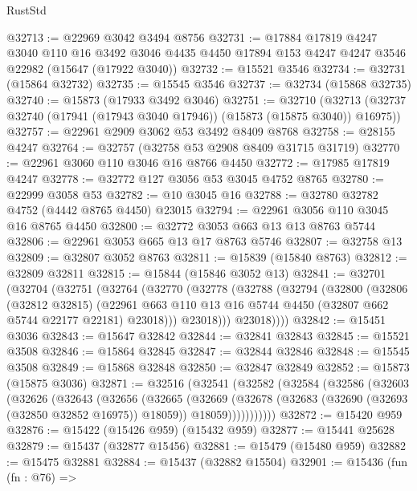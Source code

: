 \begin{lexlean}{RustStd}
\begin{coremodule}
@32713 := @22969 @3042 @3494 @8756
@32731 := @17884
    @17819
    @4247
    @3040
    @110
    @16
    @3492
    @3046
    @4435
    @4450
    @17894
    @153
    @4247
    @4247
    @3546
    @22982
    (@15647 (@17922 @3040))
@32732 := @15521 @3546
@32734 := @32731 (@15864 @32732)
@32735 := @15545 @3546
@32737 := @32734 (@15868 @32735)
@32740 := @15873 (@17933 @3492 @3046)
@32751 := @32710
    (@32713 (@32737 @32740 (@17941 (@17943 @3040 @17946)) (@15873 (@15875 @3040)) @16975))
@32757 := @22961 @2909 @3062 @53 @3492 @8409 @8768
@32758 := @28155 @4247
@32764 := @32757 (@32758 @53 @2908 @8409 @31715 @31719)
@32770 := @22961 @3060 @110 @3046 @16 @8766 @4450
@32772 := @17985 @17819 @4247
@32778 := @32772 @127 @3056 @53 @3045 @4752 @8765
@32780 := @22999 @3058 @53
@32782 := @10 @3045 @16
@32788 := @32780 @32782 @4752 (@4442 @8765 @4450) @23015
@32794 := @22961 @3056 @110 @3045 @16 @8765 @4450
@32800 := @32772 @3053 @663 @13 @13 @8763 @5744
@32806 := @22961 @3053 @665 @13 @17 @8763 @5746
@32807 := @32758 @13
@32809 := @32807 @3052 @8763
@32811 := @15839 (@15840 @8763)
@32812 := @32809 @32811
@32815 := @15844 (@15846 @3052 @13)
@32841 := @32701
    (@32704
      (@32751
        (@32764
          (@32770
            (@32778
              (@32788
                (@32794
                  (@32800
                    (@32806
                      (@32812 @32815)
                      (@22961
                        @663
                        @110
                        @13
                        @16
                        @5744
                        @4450
                        (@32807 @662 @5744 @22177 @22181)
                        @23018)))
                  @23018)))
            @23018))))
@32842 := @15451 @3036
@32843 := @15647 @32842
@32844 := @32841 @32843
@32845 := @15521 @3508
@32846 := @15864 @32845
@32847 := @32844 @32846
@32848 := @15545 @3508
@32849 := @15868 @32848
@32850 := @32847 @32849
@32852 := @15873 (@15875 @3036)
@32871 := @32516
    (@32541
      (@32582
        (@32584
          (@32586
            (@32603
              (@32626
                (@32643
                  (@32656
                    (@32665
                      (@32669
                        (@32678
                          (@32683 (@32690 (@32693 (@32850 @32852 @16975)) @18059))
                          @18059)))))))))))
@32872 := @15420 @959
@32876 := @15422 (@15426 @959) (@15432 @959)
@32877 := @15441 @25628
@32879 := @15437 (@32877 @15456)
@32881 := @15479 (@15480 @959)
@32882 := @15475 @32881
@32884 := @15437 (@32882 @15504)
@32901 := @15436
    (fun (fn : @76) =>

\end{coremodule}
\end{lexlean}
